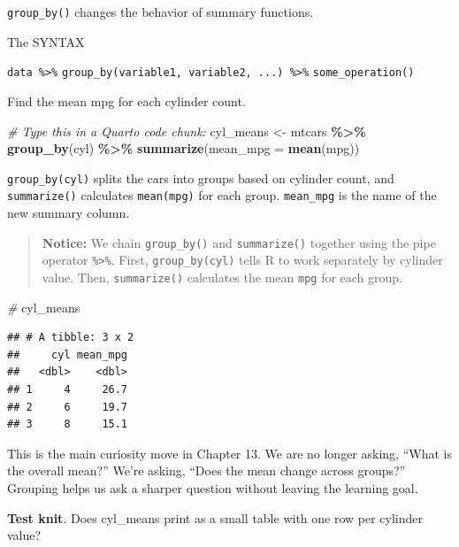 \documentclass[
]{article}
\newenvironment{Shaded}{\begin{snugshade}}{\end{snugshade}}
\newcommand{\AttributeTok}[1]{\textcolor[rgb]{0.13,0.29,0.53}{#1}}
\newcommand{\CommentTok}[1]{\textcolor[rgb]{0.56,0.35,0.01}{\textit{#1}}}
\newcommand{\FunctionTok}[1]{\textcolor[rgb]{0.13,0.29,0.53}{\textbf{#1}}}
\newcommand{\NormalTok}[1]{#1}
\newcommand{\OtherTok}[1]{\textcolor[rgb]{0.56,0.35,0.01}{#1}}
\newcommand{\SpecialCharTok}[1]{\textcolor[rgb]{0.81,0.36,0.00}{\textbf{#1}}}
\begin{document}
\texttt{group\_by()} changes the behavior of summary functions.

The SYNTAX

\texttt{data\ \%\textgreater{}\%}
\texttt{group\_by(variable1,\ variable2,\ ...)\ \%\textgreater{}\%}
\texttt{some\_operation()}

Find the mean mpg for each cylinder count.

\begin{Shaded}
\begin{Highlighting}[]
\CommentTok{\#  Type this in a Quarto code chunk:}
\NormalTok{cyl\_means }\OtherTok{\textless{}{-}}\NormalTok{ mtcars }\SpecialCharTok{\%\textgreater{}\%}
  \FunctionTok{group\_by}\NormalTok{(cyl) }\SpecialCharTok{\%\textgreater{}\%}
  \FunctionTok{summarize}\NormalTok{(}\AttributeTok{mean\_mpg =} \FunctionTok{mean}\NormalTok{(mpg))}
\end{Highlighting}
\end{Shaded}

\texttt{group\_by(cyl)} splits the cars into groups based on cylinder
count, and \texttt{summarize()} calculates \texttt{mean(mpg)} for each
group. \texttt{mean\_mpg} is the name of the new summary column.

\begin{quote}
\textbf{Notice:} We chain \texttt{group\_by()} and \texttt{summarize()}
together using the pipe operator \texttt{\%\textgreater{}\%}. First,
\texttt{group\_by(cyl)} tells R to work separately by cylinder value.
Then, \texttt{summarize()} calculates the mean \texttt{mpg} for each
group.
\end{quote}

\begin{Shaded}
\begin{Highlighting}[]
\CommentTok{\#  }
\NormalTok{cyl\_means  }
\end{Highlighting}
\end{Shaded}

\begin{verbatim}
## # A tibble: 3 x 2
##     cyl mean_mpg
##   <dbl>    <dbl>
## 1     4     26.7
## 2     6     19.7
## 3     8     15.1
\end{verbatim}

This is the main curiosity move in Chapter 13. We are no longer asking,
``What is the overall mean?'' We're asking, ``Does the mean change
across groups?'' Grouping helps us ask a sharper question without
leaving the learning goal.

\textbf{Test knit}. Does cyl\_means print as a small table with one row
per cylinder value?
\end{document}
